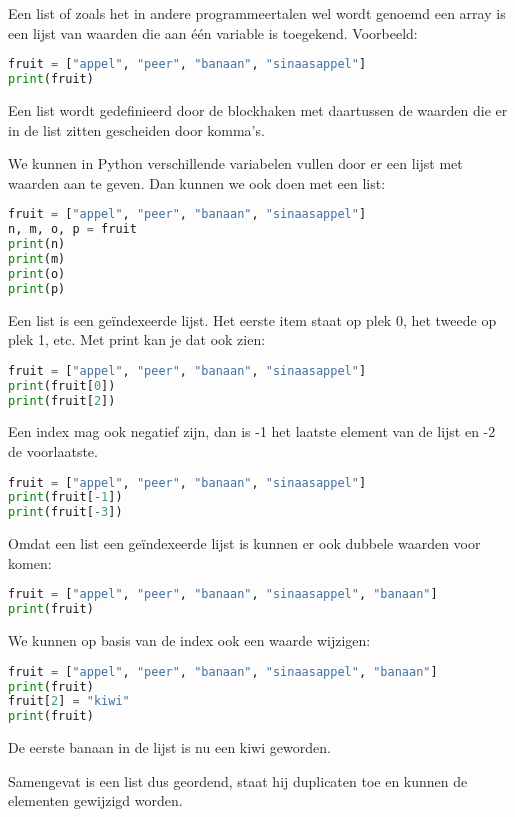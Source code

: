 Een list of zoals het in andere programmeertalen wel wordt genoemd een array is een lijst van waarden die aan \'e\'en variable is toegekend. Voorbeeld:
\begin{lstlisting}[language=python]
fruit = ["appel", "peer", "banaan", "sinaasappel"]
print(fruit)
\end{lstlisting}
Een list wordt gedefinieerd door de blockhaken met daartussen de waarden die er in de list zitten gescheiden door komma's.

We kunnen in Python verschillende variabelen vullen door er een lijst met waarden aan te geven. Dan kunnen we ook doen met een list:
\begin{lstlisting}[language=python]
fruit = ["appel", "peer", "banaan", "sinaasappel"]
n, m, o, p = fruit
print(n)
print(m)
print(o)
print(p)
\end{lstlisting}

Een list is een ge\"indexeerde lijst. Het eerste item staat op plek 0, het tweede op plek 1, etc. Met print kan je dat ook zien:
\begin{lstlisting}[language=python]
fruit = ["appel", "peer", "banaan", "sinaasappel"]
print(fruit[0])
print(fruit[2])
\end{lstlisting}
Een index mag ook negatief zijn, dan is -1 het laatste element van de lijst en -2 de voorlaatste.
\begin{lstlisting}[language=python]
fruit = ["appel", "peer", "banaan", "sinaasappel"]
print(fruit[-1])
print(fruit[-3])
\end{lstlisting}

Omdat een list een ge\"indexeerde lijst is kunnen er ook dubbele waarden voor komen:
\begin{lstlisting}[language=python]
fruit = ["appel", "peer", "banaan", "sinaasappel", "banaan"]
print(fruit)
\end{lstlisting}
We kunnen op basis van de index ook een waarde wijzigen:
\begin{lstlisting}[language=python]
fruit = ["appel", "peer", "banaan", "sinaasappel", "banaan"]
print(fruit)
fruit[2] = "kiwi"
print(fruit)
\end{lstlisting}
De eerste banaan in de lijst is nu een kiwi geworden.

Samengevat is een list dus geordend, staat hij duplicaten toe en kunnen de elementen gewijzigd worden.

